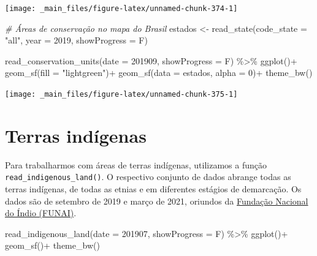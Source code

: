 \documentclass[
  brazilian,
]{book}
\newenvironment{Shaded}{\begin{snugshade}}{\end{snugshade}}
\newcommand{\AttributeTok}[1]{\textcolor[rgb]{0.77,0.63,0.00}{#1}}
\newcommand{\CommentTok}[1]{\textcolor[rgb]{0.56,0.35,0.01}{\textit{#1}}}
\newcommand{\DecValTok}[1]{\textcolor[rgb]{0.00,0.00,0.81}{#1}}
\newcommand{\FunctionTok}[1]{\textcolor[rgb]{0.00,0.00,0.00}{#1}}
\newcommand{\NormalTok}[1]{#1}
\newcommand{\OtherTok}[1]{\textcolor[rgb]{0.56,0.35,0.01}{#1}}
\newcommand{\SpecialCharTok}[1]{\textcolor[rgb]{0.00,0.00,0.00}{#1}}
\newcommand{\StringTok}[1]{\textcolor[rgb]{0.31,0.60,0.02}{#1}}
\begin{document}
\begin{center}\texttt{[image: \_main\_files/figure-latex/unnamed-chunk-374-1]} \end{center}

\begin{Shaded}
\begin{Highlighting}[]
\CommentTok{\# Áreas de conservação no mapa do Brasil}
\NormalTok{estados }\OtherTok{\textless{}{-}} \FunctionTok{read\_state}\NormalTok{(}\AttributeTok{code\_state =} \StringTok{"all"}\NormalTok{,}
                      \AttributeTok{year =} \DecValTok{2019}\NormalTok{,}
                      \AttributeTok{showProgress =}\NormalTok{ F)}

\FunctionTok{read\_conservation\_units}\NormalTok{(}\AttributeTok{date =} \DecValTok{201909}\NormalTok{,}
                        \AttributeTok{showProgress =}\NormalTok{ F) }\SpecialCharTok{\%\textgreater{}\%} 
  \FunctionTok{ggplot}\NormalTok{()}\SpecialCharTok{+}
  \FunctionTok{geom\_sf}\NormalTok{(}\AttributeTok{fill =} \StringTok{"lightgreen"}\NormalTok{)}\SpecialCharTok{+}
  \FunctionTok{geom\_sf}\NormalTok{(}\AttributeTok{data =}\NormalTok{ estados, }\AttributeTok{alpha =} \DecValTok{0}\NormalTok{)}\SpecialCharTok{+}
  \FunctionTok{theme\_bw}\NormalTok{()}
\end{Highlighting}
\end{Shaded}

\begin{center}\texttt{[image: \_main\_files/figure-latex/unnamed-chunk-375-1]} \end{center}

\hypertarget{terras-induxedgenas}{%
\section{Terras indígenas}\label{terras-induxedgenas}}

Para trabalharmos com áreas de terras indígenas, utilizamos a função \texttt{read\_indigenous\_land()}. O respectivo conjunto de dados abrange todas as terras indígenas, de todas as etnias e em diferentes estágios de demarcação. Os dados são de setembro de 2019 e março de 2021, oriundos da \href{https://www.gov.br/funai/pt-br}{Fundação Nacional do Índio (FUNAI)}.

\begin{Shaded}
\begin{Highlighting}[]
\FunctionTok{read\_indigenous\_land}\NormalTok{(}\AttributeTok{date =} \DecValTok{201907}\NormalTok{,}
                     \AttributeTok{showProgress =}\NormalTok{ F) }\SpecialCharTok{\%\textgreater{}\%} 
  \FunctionTok{ggplot}\NormalTok{()}\SpecialCharTok{+}
  \FunctionTok{geom\_sf}\NormalTok{()}\SpecialCharTok{+}
  \FunctionTok{theme\_bw}\NormalTok{()}
\end{Highlighting}
\end{Shaded}
\end{document}

